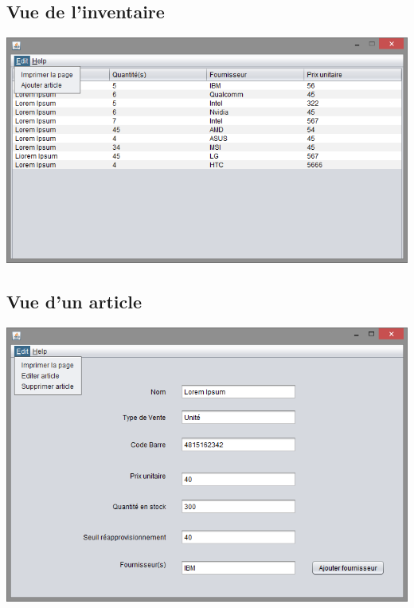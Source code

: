 \subsection{Vue de l'inventaire}
\begin{center}
	\includegraphics[width=14cm]{Analyse/InventaireView.png}
\end{center}

\subsection{Vue d'un article}
\begin{center}
	\includegraphics[width=14cm]{Analyse/ArticleView.png}
\end{center}

